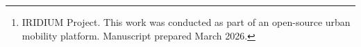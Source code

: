 \author{
  Olaf~Yunus~Laitinen~Imanov,
  Amina~Sadiqzade,
  Malahat~Ismayilova,
  Aslan~Ibadullayev,
  and~Fidan~Bagirova
\thanks{IRIDIUM Project. This work was conducted as part of an open-source urban mobility platform. Manuscript prepared March 2026.}
}
